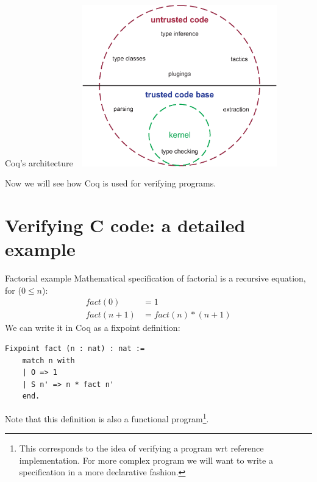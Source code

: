 \documentclass[10pt]{beamer}
\begin{document}
\begin{frame}{Coq's architecture}
    \includegraphics[width=9cm,height=7cm]{pictures/circ.eps}
    \cite{SozeauPic}
\end{frame}

\begin{frame}
 Now we will see how Coq is used for verifying programs.
\end{frame}



\section{Verifying C code: a detailed example}


\begin{frame}[fragile]{Factorial example}
  Mathematical specification of factorial is a recursive equation, for ($0 \leq n$):\begin{align*}
  fact(0) &= 1 \\
  fact(n + 1) &= fact(n)*(n+1)    
  \end{align*}
  We can write it in Coq as a fixpoint definition:
  \begin{lstlisting}[language=Coq]
  Fixpoint fact (n : nat) : nat :=
    match n with
    | O => 1
    | S n' => n * fact n'
    end.
  \end{lstlisting}
  Note that this definition is also a functional program\footnote{This corresponds to the idea of verifying a program wrt reference implementation. For more complex program we will want to write a specification in a more declarative fashion.}.
 
\end{frame}
\end{document}
